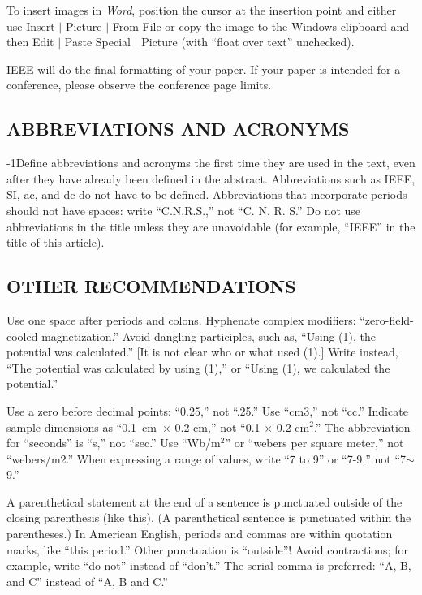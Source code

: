 \documentclass{IEEEjmw}
\begin{document}
To insert images in {\it Word}, position the cursor at the insertion point and either use Insert $|$ Picture $|$ From File or copy the image to the Windows clipboard and then Edit $|$ Paste Special $|$ Picture (with ``float over text'' unchecked). 

IEEE will do the final formatting of your paper. If your paper is intended for a conference, please observe the conference page limits.

\subsection{ABBREVIATIONS AND ACRONYMS}

\looseness-1Define abbreviations and acronyms the first time they are used in the text, even after they have already been defined in the abstract. Abbreviations such as IEEE, SI, ac, and dc do not have to be defined. Abbreviations that incorporate periods should not have spaces: write ``C.N.R.S.,'' not ``C. N. R. S.'' Do not use abbreviations in the title unless they are unavoidable (for example, ``IEEE'' in the title of this article).

\subsection{OTHER RECOMMENDATIONS}

Use one space after periods and colons. Hyphenate complex modifiers: ``zero-field-cooled magnetization.'' Avoid dangling participles, such as, ``Using (1), the potential was calculated.'' [It is not clear who or what used (1).] Write instead, ``The potential was calculated by using (1),'' or ``Using (1), we calculated the potential.''

Use a zero before decimal points: ``0.25,'' not ``.25.'' Use ``cm3,'' not ``cc.'' Indicate sample dimensions as ``0.1~cm~$\times$ 0.2 cm,'' not ``0.1 $\times$ 0.2 cm$^2$.'' The abbreviation for ``seconds'' is ``s,'' not ``sec.'' Use ``Wb/m$^2$'' or ``webers per square meter,'' not ``webers/m2.'' When expressing a range of values, write ``7 to 9'' or ``7-9,'' not ``7$\sim$9.''

A parenthetical statement at the end of a sentence is punctuated outside of the closing parenthesis (like this). (A parenthetical sentence is punctuated within the parentheses.) In American English, periods and commas are within quotation marks, like ``this period.'' Other punctuation is ``outside''$!$ Avoid contractions; for example, write ``do not'' instead of ``don't.'' The serial comma is preferred: ``A, B, and C'' instead of ``A, B and C.''
\end{document}
